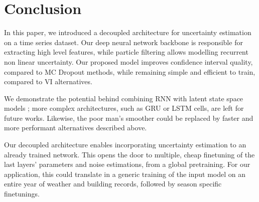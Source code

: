\documentclass{article}
\begin{document}

\section{Conclusion}%
\label{sec:conclusion}

In this paper, we introduced a decoupled architecture for uncertainty estimation on a time series dataset.
Our deep neural network backbone is responsible for extracting high level features, while particle filtering allows modelling recurrent non linear uncertainty.
Our proposed model improves confidence interval quality, compared to MC Dropout methods, while remaining simple and efficient to train, compared to VI alternatives.

We demonstrate the potential behind combining RNN with latent state space models ; more complex architectures, such as GRU or LSTM cells, are left for future works.
Likewise, the poor man's smoother could be replaced by faster and more performant alternatives described above.

Our decoupled architecture enables incorporating uncertainty estimation to an already trained network.
This opens the door to multiple, cheap finetuning of the last layers' parameters and noise estimations, from a global pretraining.
For our application, this could translate in a generic training of the input model on an entire year of weather and building records, followed by season specific finetunings.

\end{document}
